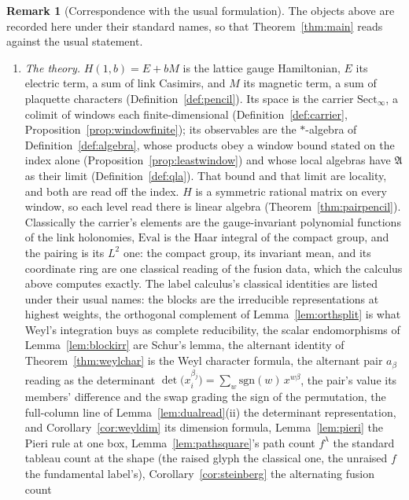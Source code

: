 \documentclass[11pt]{article}
\theoremstyle{definition}
\newtheorem{remark}{Remark}
\begin{document}
\begin{remark}[Correspondence with the usual formulation]\label{rem:dictionary}
The objects above are recorded here under their standard names, so
that Theorem~\ref{thm:main} reads against the usual statement.
\begin{enumerate}[leftmargin=2em,itemsep=3pt]

\item \emph{The theory.} $H(1,b)=E+bM$ is the lattice gauge Hamiltonian, $E$ its
electric term, a sum of link Casimirs, and $M$ its magnetic term, a sum of
plaquette characters (Definition~\ref{def:pencil}). Its space is the carrier
$\mathrm{Sect}_\infty$, a colimit of windows each finite-dimensional
(Definition~\ref{def:carrier}, Proposition~\ref{prop:windowfinite}); its
observables are the $\ast$-algebra of Definition~\ref{def:algebra}, whose
products obey a window bound stated on the index alone
(Proposition~\ref{prop:leastwindow}) and whose local algebras have $\mathfrak A$
as their limit (Definition~\ref{def:qla}). That bound and that limit are
locality, and both are read off the index. $H$ is a symmetric rational matrix
on every window, so each level read there is linear algebra
(Theorem~\ref{thm:pairpencil}). Classically the carrier's elements are
the gauge-invariant polynomial functions of the link holonomies,
$\mathrm{Eval}$ is the Haar integral of the compact group, and the pairing
is its $L^2$ one: the compact group, its invariant mean, and its coordinate
ring are one classical reading of the fusion data, which the calculus above
computes exactly. The label calculus's classical identities are
listed under their usual names: the blocks are the irreducible representations at highest
weights, the orthogonal complement of Lemma~\ref{lem:orthsplit} is what
Weyl's integration buys as complete reducibility, the scalar endomorphisms
of Lemma~\ref{lem:blockirr} are Schur's lemma, the alternant identity of
Theorem~\ref{thm:weylchar} is the Weyl character formula, the
alternant pair $a_\beta$ reading as the determinant
$\det\big(x_i^{\beta_j}\big)=\sum_w\mathrm{sgn}(w)\,x^{w\beta}$, the
pair's value its members' difference and the swap grading the sign of
the permutation, the full-column line of
Lemma~\ref{lem:dualread}(ii) the determinant representation, and
Corollary~\ref{cor:weyldim} its dimension formula,
Lemma~\ref{lem:pieri} the Pieri rule at one box,
Lemma~\ref{lem:pathsquare}'s path count $f^\lambda$ the standard
tableau count at the shape (the raised glyph the classical one,
the unraised $f$ the fundamental label's),
Corollary~\ref{cor:steinberg} the alternating fusion count

\end{enumerate}
\end{remark}
\end{document}
